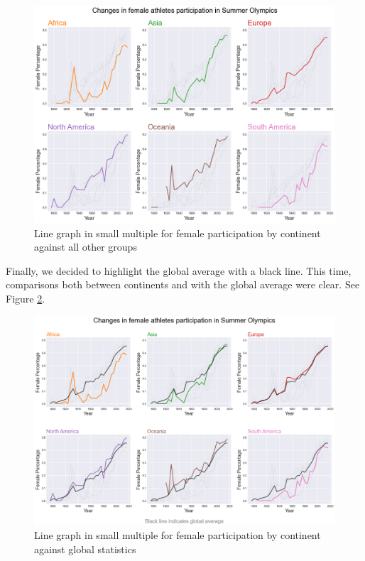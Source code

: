 \documentclass[
]{article}
\begin{document}
\begin{figure}

{\centering \includegraphics[width=1\linewidth]{static/vis/g-2-5} 

}

\caption{Line graph in small multiple for female participation by continent against all other groups}\label{fig:figure28}
\end{figure}

Finally, we decided to highlight the global average with a black line. This time, comparisons both between continents and with the global average were clear. See Figure \ref{fig:figure29}.

\begin{figure}

{\centering \includegraphics[width=1\linewidth]{static/vis/g-2-6} 

}

\caption{Line graph in small multiple for female participation by continent against global statistics}\label{fig:figure29}
\end{figure}
\end{document}
